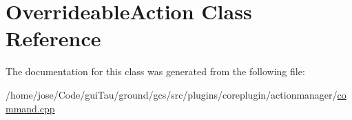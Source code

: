 \hypertarget{class_overrideable_action}{\section{Overrideable\-Action Class Reference}
\label{class_overrideable_action}
}


The documentation for this class was generated from the following file\-:\begin{DoxyCompactItemize}
\item 
/home/jose/\-Code/gui\-Tau/ground/gcs/src/plugins/coreplugin/actionmanager/\hyperlink{command_8cpp}{command.\-cpp}\end{DoxyCompactItemize}
